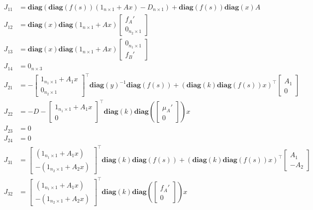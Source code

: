 \documentclass[3p,times]{elsarticle}
\newcommand{\diag}{\textbf{diag}}
\begin{document}
\begin{align}
J_{11} &=  \diag(\diag(f(s))(1_{n\times 1} +Ax)-D_{n\times 1})
+\diag(f(s))\diag(x)A \\
J_{12} &= \diag(x)\diag(1_{n \times 1}+Ax)\begin{bmatrix} f_A' \\ 0_{n_2 \times 1} \end{bmatrix}  \\
J_{13} &=\diag(x)\diag(1_{n\times 1}+Ax)\begin{bmatrix} 0_{n_1 \times 1} \\ f_B' \end{bmatrix} \\
J_{14} &= 0_{n\times 3}\\
J_{21} &= -\begin{bmatrix}
1_{n_1 \times 1} + A_1 x \\ 0_{n_2 \times 1} \end{bmatrix}^\top \diag(y)^{-1} \diag (f(s))  + (\diag(k)\diag(f(s))x)^\top\begin{bmatrix} A_1 \\ 0 \end{bmatrix}  \\
J_{22} &= -D  - \begin{bmatrix} 1_{n_1 \times 1} + A_1x \\ 0 \end{bmatrix}^\top \diag(k) \diag\left( \begin{bmatrix}\mu_A' \\ 0 \end{bmatrix}\right)x \\
J_{23} & = 0 \\
J_{24} &= 0 \\
J_{31} &= \begin{bmatrix} \left(1_{n_1 \times 1}+A_1x \right)\\ - \left(1_{n_2 \times 1} + A_2x \right)  \end{bmatrix}^\top \diag(k) \diag(f(s)) 
+  (\diag(k)\diag(f(s))x)^\top \begin{bmatrix}A_1 \\ -A_2\end{bmatrix} \\
J_{32} &= \begin{bmatrix}\left(1_{n_1 \times 1} + A_1x\right)\\ -\left(1_{n_2 \times 1} + A_2x\right)\end{bmatrix}^\top \diag(k) \diag\left( \begin{bmatrix}
f_A' \\ 0\end{bmatrix}\right)x \\

\end{align}
\end{document}
